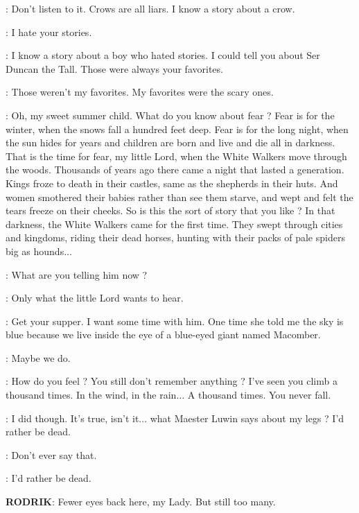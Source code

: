 \OLDNAN: Don't listen to it. Crows are all liars. I know a story about a crow. 

\BRAN: I hate your stories. 

\OLDNAN: I know a story about a boy who hated stories. I could tell you about Ser Duncan the Tall. Those were always your favorites. 

\BRAN: Those weren't my favorites. My favorites were the scary ones. 

\OLDNAN: Oh, my sweet summer child. What do you know about fear ? Fear is for the winter, when the snows fall a hundred feet deep. Fear is for the long night, when the sun hides for years and children are born and live and die all in darkness. That is the time for fear, my little Lord, when the White Walkers move through the woods. Thousands of years ago there came a night that lasted a generation. Kings froze to death in their castles, same as the shepherds in their huts. And women smothered their babies rather than see them starve, and wept and felt the tears freeze on their cheeks. So is this the sort of story that you like ? In that darkness, the White Walkers came for the first time. They swept through cities and kingdoms, riding their dead horses, hunting with their packs of pale spiders big as hounds$\ldots$ 


\ROBB: What are you telling him now ? 

\OLDNAN: Only what the little Lord wants to hear. 

\ROBB: Get your supper. I want some time with him. One time she told me the sky is blue because we live inside the eye of a blue-eyed giant named Macomber. 

\BRAN: Maybe we do. 

\ROBB: How do you feel ? You still don't remember anything ? I've seen you climb a thousand times. In the wind, in the rain$\ldots$ A thousand times. You never fall. 

\BRAN: I did though. It's true, isn't it$\ldots$ what Maester Luwin says about my legs ? I'd rather be dead. 

\ROBB: Don't ever say that. 

\BRAN: I'd rather be dead. 

\scene



\textbf{RODRIK}: Fewer eyes back here, my Lady. But still too many. 

